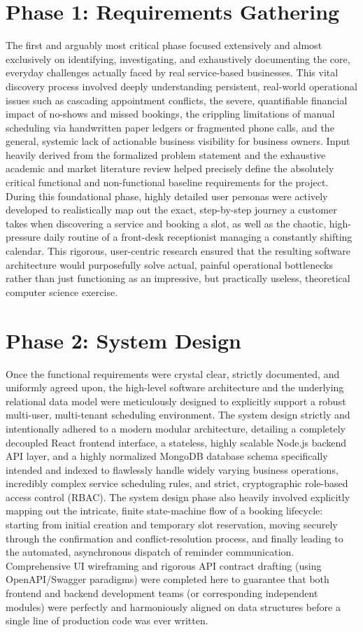 \section{Phase 1: Requirements Gathering}
The first and arguably most critical phase focused extensively and almost exclusively on identifying, investigating, and exhaustively documenting the core, everyday challenges actually faced by real service-based businesses. This vital discovery process involved deeply understanding persistent, real-world operational issues such as cascading appointment conflicts, the severe, quantifiable financial impact of no-shows and missed bookings, the crippling limitations of manual scheduling via handwritten paper ledgers or fragmented phone calls, and the general, systemic lack of actionable business visibility for business owners. Input heavily derived from the formalized problem statement and the exhaustive academic and market literature review helped precisely define the absolutely critical functional and non-functional baseline requirements for the project. During this foundational phase, highly detailed user personas were actively developed to realistically map out the exact, step-by-step journey a customer takes when discovering a service and booking a slot, as well as the chaotic, high-pressure daily routine of a front-desk receptionist managing a constantly shifting calendar. This rigorous, user-centric research ensured that the resulting software architecture would purposefully solve actual, painful operational bottlenecks rather than just functioning as an impressive, but practically useless, theoretical computer science exercise.

\section{Phase 2: System Design}
Once the functional requirements were crystal clear, strictly documented, and uniformly agreed upon, the high-level software architecture and the underlying relational data model were meticulously designed to explicitly support a robust multi-user, multi-tenant scheduling environment. The system design strictly and intentionally adhered to a modern modular architecture, detailing a completely decoupled React frontend interface, a stateless, highly scalable Node.js backend API layer, and a highly normalized MongoDB database schema specifically intended and indexed to flawlessly handle widely varying business operations, incredibly complex service scheduling rules, and strict, cryptographic role-based access control (RBAC). The system design phase also heavily involved explicitly mapping out the intricate, finite state-machine flow of a booking lifecycle: starting from initial creation and temporary slot reservation, moving securely through the confirmation and conflict-resolution process, and finally leading to the automated, asynchronous dispatch of reminder communication. Comprehensive UI wireframing and rigorous API contract drafting (using OpenAPI/Swagger paradigms) were completed here to guarantee that both frontend and backend development teams (or corresponding independent modules) were perfectly and harmoniously aligned on data structures before a single line of production code was ever written.

